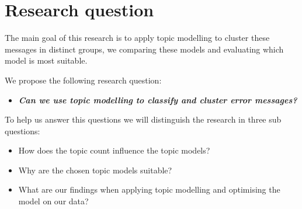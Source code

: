 \begin{comment}

Topic modelling is a hot topic in data science. System logs are used as source for the detection of problems in large computer systems. While domain experts can be used to detect and fix the problems detected, this can be difficult and time consuming. Machine learning techniques like topic modelling make it possible to develop models to extract these latent patterns from these system logs. While topic modelling is normally used in for large text corpera, recent research in the field of short text clustering and twitter tweets clustering are similar enough to by applicable for system logs. An interesting application which has not yet been touched a lot through unsupervised machine learning techniques.

\end{comment}


\section{Research question}\label{introduction:Researchquestion}
The main goal of this research is to apply topic modelling to cluster these messages in distinct groups, we comparing these models and evaluating which model is most suitable.

\noindent We propose the following research question: 
\begin{itemize}
    \item \textbf{\textit{Can we use topic modelling to classify and cluster error messages?}}
\end{itemize}

\noindent To help us answer this questions we will distinguish the research in three sub questions:
\begin{itemize}
    \item How does the topic count influence the topic models?
    \item Why are the chosen topic models suitable?
    \item What are our findings when applying topic modelling and optimising the model on our data?
\end{itemize}

\begin{comment}
What are the optimal parameters?

What are the pro's and con's of using LDA?

subquestions:
Why is LDA suitable for this type of data 

How do the parameters influence the models performance?

What are the pro's and con's of using LDA?

What other methods are available to solve this error clustering?


\end{comment}


